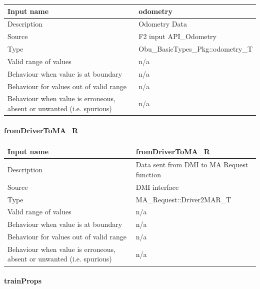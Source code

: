 \begin{longtable}{p{}p{}}
\toprule
Input name				& odometry\\
\midrule
Description				& Odometry Data  \\
\midrule
Source					& F2 input API\_Odometry \\ 
\midrule
Type					& Obu\_BasicTypes\_Pkg::odometry\_T\\
\midrule
Valid range of values	& n/a \\
\midrule
Behaviour when value is at boundary	& n/a\\
\midrule
Behaviour for values out of valid range	& n/a\\
\midrule
Behaviour when value is erroneous, absent or unwanted (i.e. spurious) & n/a\\

\bottomrule


\end{longtable}

\paragraph{fromDriverToMA\_R}

\begin{longtable}{p{}p{}}
\toprule
Input name				& fromDriverToMA\_R\\
\midrule
Description				& Data sent from DMI to MA Request function  \\
\midrule
Source					& DMI interface \\ 
\midrule
Type					& MA\_Request::Driver2MAR\_T\\
\midrule
Valid range of values	& n/a \\
\midrule
Behaviour when value is at boundary	& n/a\\
\midrule
Behaviour for values out of valid range	& n/a\\
\midrule
Behaviour when value is erroneous, absent or unwanted (i.e. spurious) & n/a\\

\bottomrule


\end{longtable}

\paragraph{trainProps}

